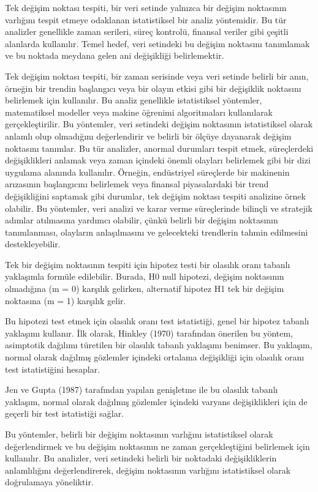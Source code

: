 \documentclass[12pt,twoside]{deuthesis}
\begin{document}
Tek değişim noktası tespiti, bir veri setinde yalnızca bir değişim noktasının varlığını tespit etmeye odaklanan istatistiksel bir analiz yöntemidir. Bu tür analizler genellikle zaman serileri, süreç kontrolü, finansal veriler gibi çeşitli alanlarda kullanılır. Temel hedef, veri setindeki bu değişim noktasını tanımlamak ve bu noktada meydana gelen ani değişikliği belirlemektir.

Tek değişim noktası tespiti, bir zaman serisinde veya veri setinde belirli bir anın, örneğin bir trendin başlangıcı veya bir olayın etkisi gibi bir değişiklik noktasını belirlemek için kullanılır. Bu analiz genellikle istatistiksel yöntemler, matematiksel modeller veya makine öğrenimi algoritmaları kullanılarak gerçekleştirilir. Bu yöntemler, veri setindeki değişim noktasının istatistiksel olarak anlamlı olup olmadığını değerlendirir ve belirli bir ölçüye dayanarak değişim noktasını tanımlar. Bu tür analizler, anormal durumları tespit etmek, süreçlerdeki değişiklikleri anlamak veya zaman içindeki önemli olayları belirlemek gibi bir dizi uygulama alanında kullanılır. Örneğin, endüstriyel süreçlerde bir makinenin arızasının başlangıcını belirlemek veya finansal piyasalardaki bir trend değişikliğini saptamak gibi durumlar, tek değişim noktası tespiti analizine örnek olabilir. Bu yöntemler, veri analizi ve karar verme süreçlerinde bilinçli ve stratejik adımlar atılmasına yardımcı olabilir, çünkü belirli bir değişim noktasının tanımlanması, olayların anlaşılmasını ve gelecekteki trendlerin tahmin edilmesini destekleyebilir.

Tek bir değişim noktasının tespiti için hipotez testi bir olasılık oranı tabanlı yaklaşımla formüle edilebilir. Burada, H0 null hipotezi, değişim noktasının olmadığına (m = 0) karşılık gelirken, alternatif hipotez H1 tek bir değişim noktasına (m = 1) karşılık gelir.

Bu hipotezi test etmek için olasılık oranı test istatistiği, genel bir hipotez tabanlı yaklaşımı kullanır. İlk olarak, Hinkley (1970) tarafından önerilen bu yöntem, asimptotik dağılımı türetilen bir olasılık tabanlı yaklaşımı benimser. Bu yaklaşım, normal olarak dağılmış gözlemler içindeki ortalama değişikliği için olasılık oranı test istatistiğini hesaplar.

Jen ve Gupta (1987) tarafından yapılan genişletme ile bu olasılık tabanlı yaklaşım, normal olarak dağılmış gözlemler içindeki varyans değişiklikleri için de geçerli bir test istatistiği sağlar.

Bu yöntemler, belirli bir değişim noktasının varlığını istatistiksel olarak değerlendirmek ve bu değişim noktasının ne zaman gerçekleştiğini belirlemek için kullanılır. Bu analizler, veri setindeki belirli bir noktadaki değişikliklerin anlamlılığını değerlendirerek, değişim noktasının varlığını istatistiksel olarak doğrulamaya yöneliktir.
\end{document}
